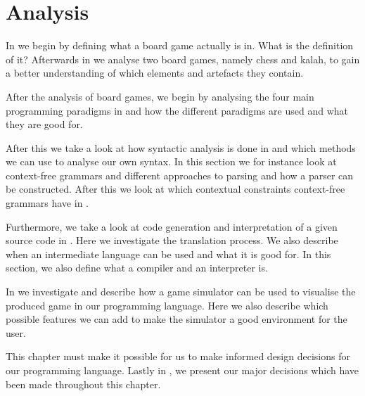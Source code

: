 \chapter{Analysis}
\label{chap:analysis}

In  we begin by defining what a board game
actually is in.  What is the definition of it? Afterwards in
 we analyse two board games, namely chess and kalah,
to gain a better understanding of which elements and artefacts they contain. 

After the analysis of board games, we begin by analysing the four main
programming paradigms in  and how the different paradigms
are used and what they are good for.

After this we take a look at how syntactic analysis is done in
 and which methods we can use to analyse our own
syntax. In this section we for instance look at context-free grammars and
different approaches to parsing and how a parser can be constructed. After this
we look at which contextual constraints context-free grammars have in
. 

Furthermore, we take a look at code generation and interpretation of a given
source code in . Here we investigate
the translation process. We also describe when an intermediate language can be
used and what it is good for. In this section, we also define what a compiler
and an interpreter is.

In  we investigate and describe how a game simulator can
be used to visualise the produced game in our programming language. Here we also
describe which possible features we can add to make the simulator a good
environment for the user. 

This chapter must make it possible for us to make informed design decisions for
our programming language. Lastly in , we present
our major decisions which have been made throughout this chapter.








